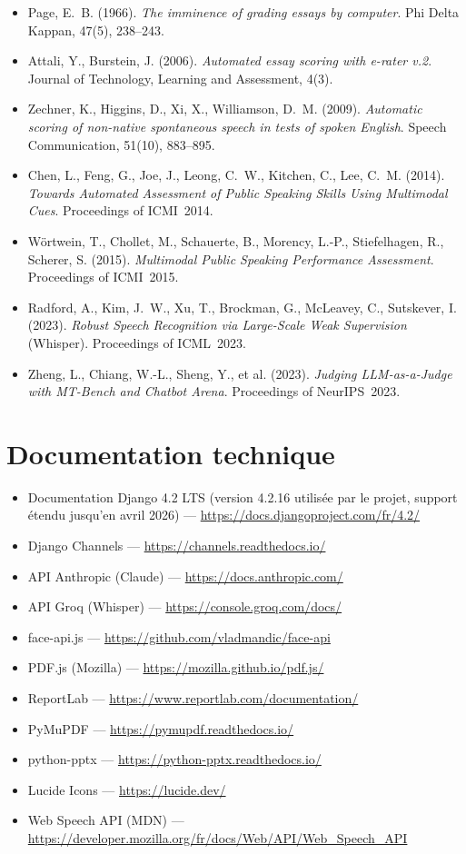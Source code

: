 \documentclass[12pt,a4paper]{report}
\begin{document}
\begin{itemize}
  \item Page, E.~B. (1966). \emph{The imminence of grading essays by
        computer}. Phi Delta Kappan, 47(5), 238--243.
  \item Attali, Y., Burstein, J. (2006). \emph{Automated essay scoring with
        e-rater v.2}. Journal of Technology, Learning and Assessment, 4(3).
  \item Zechner, K., Higgins, D., Xi, X., Williamson, D.~M. (2009).
        \emph{Automatic scoring of non-native spontaneous speech in tests of
        spoken English}. Speech Communication, 51(10), 883--895.
  \item Chen, L., Feng, G., Joe, J., Leong, C.~W., Kitchen, C., Lee, C.~M.
        (2014). \emph{Towards Automated Assessment of Public Speaking Skills
        Using Multimodal Cues}. Proceedings of ICMI~2014.
  \item Wörtwein, T., Chollet, M., Schauerte, B., Morency, L.-P.,
        Stiefelhagen, R., Scherer, S. (2015). \emph{Multimodal Public Speaking
        Performance Assessment}. Proceedings of ICMI~2015.
  \item Radford, A., Kim, J.~W., Xu, T., Brockman, G., McLeavey, C.,
        Sutskever, I. (2023). \emph{Robust Speech Recognition via Large-Scale
        Weak Supervision} (Whisper). Proceedings of ICML~2023.
  \item Zheng, L., Chiang, W.-L., Sheng, Y., et al. (2023). \emph{Judging
        LLM-as-a-Judge with MT-Bench and Chatbot Arena}. Proceedings of
        NeurIPS~2023.
\end{itemize}

\section*{Documentation technique}

\begin{itemize}
  \item Documentation Django 4.2 LTS (version 4.2.16 utilisée par le projet,
        support étendu jusqu'en avril 2026) ---
        \url{https://docs.djangoproject.com/fr/4.2/}
  \item Django Channels --- \url{https://channels.readthedocs.io/}
  \item API Anthropic (Claude) --- \url{https://docs.anthropic.com/}
  \item API Groq (Whisper) --- \url{https://console.groq.com/docs/}
  \item face-api.js --- \url{https://github.com/vladmandic/face-api}
  \item PDF.js (Mozilla) --- \url{https://mozilla.github.io/pdf.js/}
  \item ReportLab --- \url{https://www.reportlab.com/documentation/}
  \item PyMuPDF --- \url{https://pymupdf.readthedocs.io/}
  \item python-pptx --- \url{https://python-pptx.readthedocs.io/}
  \item Lucide Icons --- \url{https://lucide.dev/}
  \item Web Speech API (MDN) --- \url{https://developer.mozilla.org/fr/docs/Web/API/Web_Speech_API}
\end{itemize}
\end{document}
